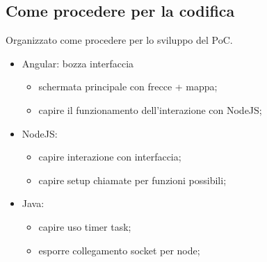 \subsection{Come procedere per la codifica}
Organizzato come procedere per lo sviluppo del PoC.
\begin{itemize}
\item Angular: bozza interfaccia
	\begin{itemize}
		\item schermata principale con frecce + mappa;
		\item capire il funzionamento dell'interazione con NodeJS;
	\end{itemize}
	
\item NodeJS: 
 \begin{itemize}
	\item capire interazione con interfaccia;
	\item capire setup chiamate per funzioni possibili;
\end{itemize}
	
\item Java: 
\begin{itemize}
	\item capire uso timer task;
	\item esporre collegamento socket per node;
\end{itemize}
	
\end{itemize}
	